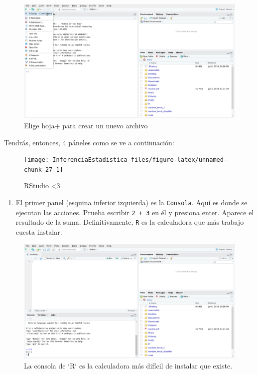 \documentclass[
]{book}
\providecommand{\tightlist}{%
  \setlength{\itemsep}{0pt}\setlength{\parskip}{0pt}}
\begin{document}
\begin{figure}

{\centering \includegraphics[width=40in]{images/RStudio2} 

}

\caption{Elige hoja+ para crear un nuevo archivo}\label{fig:unnamed-chunk-26}
\end{figure}

Tendrás, entonces, 4 páneles como se ve a continuación:

\begin{figure}

{\centering \texttt{[image: InferenciaEstadistica\_files/figure-latex/unnamed-chunk-27-1]} 

}

\caption{RStudio <3}\label{fig:unnamed-chunk-27}
\end{figure}

\begin{enumerate}
\def\labelenumi{\arabic{enumi}.}
\tightlist
\item
  El primer panel (esquina inferior izquierda) es la \texttt{Consola}. Aquí es donde se ejecutan las acciones. Prueba escribir \texttt{2\ +\ 3} en él y presiona enter. Aparece el resultado de la suma. Definitivamente, \texttt{R} es la calculadora que más trabajo cuesta instalar.
\end{enumerate}

\begin{figure}

{\centering \includegraphics[width=40in]{images/RStudio4} 

}

\caption{La consola de `R` es la calculadora más difícil de instalar que existe.}\label{fig:unnamed-chunk-28}
\end{figure}
\end{document}
